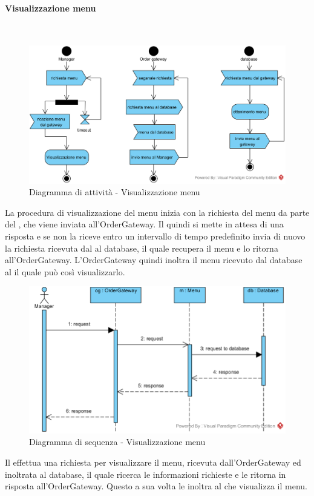 \paragraph{Visualizzazione menu}\mbox{}\\
\nopagebreak
\begin{figure}[H]
	\centering
	\includegraphics[width=14cm]{diagrammi_img/attivita/manager_get_menu.png}
	\caption{Diagramma di attività - Visualizzazione menu}
\end{figure}
La procedura di visualizzazione del menu inizia con la richiesta del menu da parte del \Manager{}, che viene inviata all'OrderGateway. Il \Manager{} quindi si mette in attesa di una risposta e se non la riceve entro un intervallo di tempo predefinito invia di nuovo la richiesta ricevuta dal \Manager{} al database, il quale recupera il menu e lo ritorna all'OrderGateway. L'OrderGateway quindi inoltra il menu ricevuto dal database al \Manager{} il quale può così visualizzarlo.

\begin{figure}[H]
	\centering
	\includegraphics[width=14cm]{../../documenti/SpecificaTecnica/diagrammi_img/sequenza/direttore_visualizza_menu.png}
	\caption{Diagramma di sequenza - Visualizzazione menu}
\end{figure}
Il \Manager{} effettua una richiesta per visualizzare il menu, ricevuta dall'Order\-Gateway ed inoltrata al database, il quale ricerca le informazioni richieste e le ritorna in risposta all'Order\-Gateway. Questo a sua volta le inoltra al \Manager{} che visualizza il menu.

